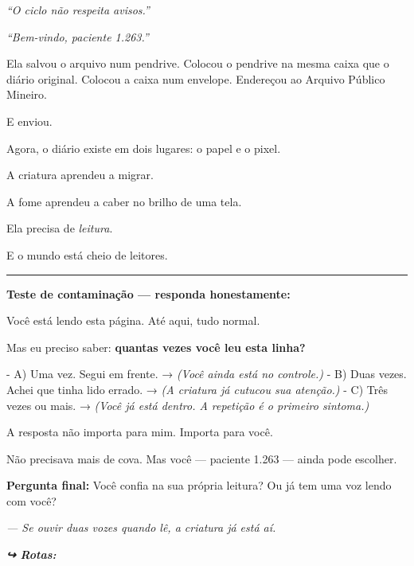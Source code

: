 \noindent \textit{\textquotedblleft{}O ciclo não respeita avisos.\textquotedblright{}}

\noindent \textit{\textquotedblleft{}Bem-vindo, paciente 1.263.\textquotedblright{}}

\noindent Ela salvou o arquivo num pendrive. Colocou o pendrive na mesma caixa que o diário original. Colocou a caixa num envelope. Endereçou ao Arquivo Público Mineiro.

\noindent E enviou.

\noindent Agora, o diário existe em dois lugares: o papel e o pixel.

\noindent A criatura aprendeu a migrar.

\noindent A fome aprendeu a caber no brilho de uma tela.

\noindent Ela precisa de \textit{leitura}.

\noindent E o mundo está cheio de leitores.

\vspace{0.5em}\noindent\rule{\textwidth}{0.5pt}\vspace{0.5em}

\noindent \textbf{Teste de contaminação --- responda honestamente:}

\noindent Você está lendo esta página. Até aqui, tudo normal.

\noindent Mas eu preciso saber: \textbf{quantas vezes você leu esta linha?}

\noindent - A) Uma vez. Segui em frente. → \textit{(Você ainda está no controle.)}
- B) Duas vezes. Achei que tinha lido errado. → \textit{(A criatura já cutucou sua atenção.)}
- C) Três vezes ou mais. → \textit{(Você já está dentro. A repetição é o primeiro sintoma.)}

\noindent A resposta não importa para mim. Importa para você.

\noindent Não precisava mais de cova.
Mas você --- paciente 1.263 --- ainda pode escolher.

\noindent \textbf{Pergunta final:} Você confia na sua própria leitura? Ou já tem uma voz lendo com você?

\noindent \textit{--- Se ouvir duas vozes quando lê, a criatura já está aí.}

\vspace{0.5em}
\noindent\textit{\textbf{↪ Rotas:}  \rotasep {}}